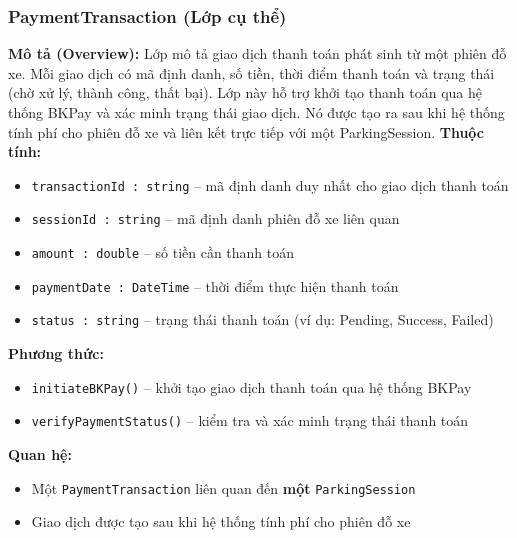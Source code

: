 \subsubsection{PaymentTransaction (Lớp cụ thể)}
\textbf{Mô tả (Overview):} Lớp mô tả giao dịch thanh toán phát sinh từ một phiên đỗ xe. Mỗi giao dịch có mã định danh, số tiền, thời điểm thanh toán và trạng thái (chờ xử lý, thành công, thất bại). Lớp này hỗ trợ khởi tạo thanh toán qua hệ thống BKPay và xác minh trạng thái giao dịch. Nó được tạo ra sau khi hệ thống tính phí cho phiên đỗ xe và liên kết trực tiếp với một ParkingSession.
\textbf{Thuộc tính:}
\begin{itemize}[noitemsep]
  \item \texttt{transactionId : string} -- mã định danh duy nhất cho giao dịch thanh toán
  \item \texttt{sessionId : string} -- mã định danh phiên đỗ xe liên quan
  \item \texttt{amount : double} -- số tiền cần thanh toán
  \item \texttt{paymentDate : DateTime} -- thời điểm thực hiện thanh toán
  \item \texttt{status : string} -- trạng thái thanh toán (ví dụ: Pending, Success, Failed)
\end{itemize}

\textbf{Phương thức:}
\begin{itemize}[noitemsep]
  \item \texttt{initiateBKPay()} -- khởi tạo giao dịch thanh toán qua hệ thống BKPay
  \item \texttt{verifyPaymentStatus()} -- kiểm tra và xác minh trạng thái thanh toán
\end{itemize}

\textbf{Quan hệ:}
\begin{itemize}[noitemsep]
  \item Một \texttt{PaymentTransaction} liên quan đến \textbf{một} \texttt{ParkingSession}
  \item Giao dịch được tạo sau khi hệ thống tính phí cho phiên đỗ xe
\end{itemize}

